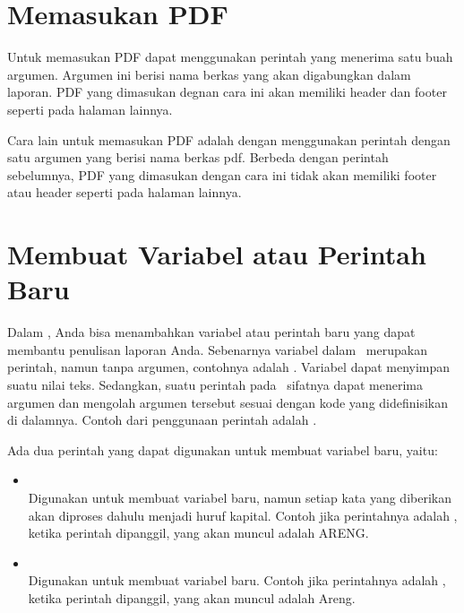 \section{Memasukan PDF}
\label{sec:pdf}
Untuk memasukan PDF dapat menggunakan perintah  yang menerima satu buah argumen.
Argumen ini berisi nama berkas yang akan digabungkan dalam laporan.
PDF yang dimasukan degnan cara ini akan memiliki header dan footer seperti pada halaman lainnya.


Cara lain untuk memasukan PDF adalah dengan menggunakan perintah  dengan satu argumen yang berisi nama berkas pdf.
Berbeda dengan perintah sebelumnya, PDF yang dimasukan dengan cara ini tidak akan memiliki footer atau header seperti pada halaman lainnya.



\section{Membuat Variabel atau Perintah Baru}
\label{sec:newCommand}
Dalam \latex, Anda bisa menambahkan variabel atau perintah baru yang dapat membantu penulisan laporan Anda. Sebenarnya variabel dalam \latex~merupakan perintah, namun tanpa argumen, contohnya adalah . Variabel dapat menyimpan suatu nilai teks. Sedangkan, suatu perintah pada \latex~sifatnya dapat menerima argumen dan mengolah argumen tersebut sesuai dengan kode yang didefinisikan di dalamnya. Contoh dari penggunaan perintah adalah .

Ada dua perintah yang dapat digunakan untuk membuat variabel baru, yaitu:
\begin{itemize}
	\item {} \\
	Digunakan untuk membuat variabel baru, namun setiap kata yang diberikan akan diproses dahulu menjadi huruf kapital.
	Contoh jika perintahnya adalah , ketika perintah  dipanggil, yang akan muncul adalah ARENG.
	\item {} \\
	Digunakan untuk membuat variabel baru.
	Contoh jika perintahnya adalah , ketika perintah  dipanggil, yang akan muncul adalah Areng.
\end{itemize}

